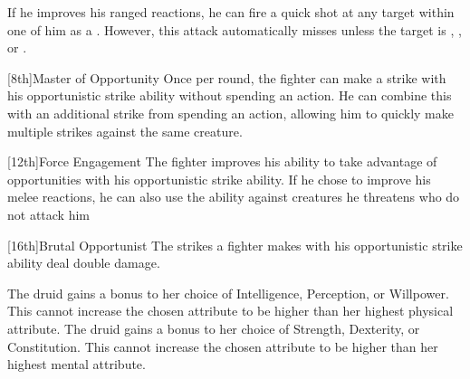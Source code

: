         If he improves his ranged reactions, he can fire a quick shot at any target within one  of him as a .
        However, this attack automatically misses unless the target is , \helpless, or \unaware.

        [8th]{Master of Opportunity}
        Once per round, the fighter can make a strike with his opportunistic strike ability without spending an action.
        He can combine this with an additional strike from spending an action, allowing him to quickly make multiple strikes against the same creature.

        [12th]{Force Engagement}
        The fighter improves his ability to take advantage of opportunities with his opportunistic strike ability.
        If he chose to improve his melee reactions, he can also use the ability against creatures he threatens who do not attack him 

        [16th]{Brutal Opportunist}
        The strikes a fighter makes with his opportunistic strike ability deal double damage.

        The druid gains a  bonus to her choice of Intelligence, Perception, or Willpower.
        This cannot increase the chosen attribute to be higher than her highest physical attribute.
        The druid gains a  bonus to her choice of Strength, Dexterity, or Constitution.
        This cannot increase the chosen attribute to be higher than her highest mental attribute.
